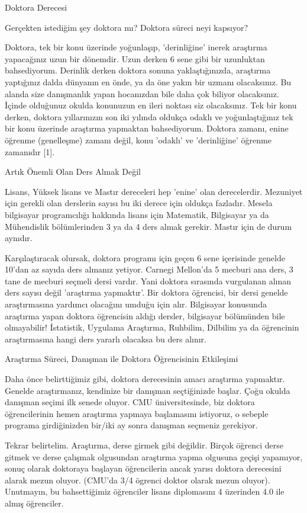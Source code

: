 \documentclass[12pt,fleqn]{article}\usepackage{../../common}
\begin{document}
Doktora Derecesi

Gerçekten istediğim şey doktora mı? Doktora süreci neyi kapsıyor?

Doktora, tek bir konu üzerinde yoğunlaşıp, 'derinliğine' inerek araştırma
yapacağınız uzun bir dönemdir. Uzun derken 6 sene gibi bir uzunluktan
bahsediyorum. Derinlik derken doktora sonuna yaklaştığınızda, araştırma
yaptığınız dalda dünyanın en önde, ya da öne yakın bir uzmanı
olacaksınız. Bu alanda size danışmanlık yapan hocanızdan bile daha çok
biliyor olacaksınız. İçinde olduğunuz okulda konunuzun en ileri noktası siz
olacaksınız. Tek bir konu derken, doktora yıllarınızın son iki yılında
oldukça odaklı ve yoğunlaştığınız tek bir konu üzerinde araştırma yapmaktan
bahsediyorum. Doktora zamanı, enine öğrenme (genelleşme) zamanı değil, konu
'odaklı' ve 'derinliğine' öğrenme zamanıdır [1].

Artık Önemli Olan Ders Almak Değil

Lisans, Yüksek lisans ve Mastır dereceleri hep 'enine' olan
derecelerdir. Mezuniyet için gerekli olan derslerin sayısı bu iki derece
için oldukça fazladır. Mesela bilgisayar programcılığı hakkında lisans için
Matematik, Bilgisayar ya da Mühendislik bölümlerinden 3 ya da 4 ders almak
gerekir. Mastır için de durum aynıdır.

Karşılaştıracak olursak, doktora programı için geçen 6 sene içerisinde
genelde 10'dan az sayıda ders almanız yetiyor. Carnegi Mellon'da 5 mecburi
ana ders, 3 tane de mecburi seçmeli dersi vardır. Yani doktora sırasında
vurgulanan alınan ders sayısı değil 'araştırma yapmaktır'. Bir doktora
öğrencisi, bir dersi genelde araştırmasına yardımcı olacağını umduğu için
alır. Bilgisayar konusunda araştırma yapan doktora öğrencisin aldığı
dersler, bilgisayar bölümünden bile olmayabilir! İstatistik, Uygulama
Araştırma, Ruhbilim, Dilbilim ya da öğrencinin araştırmasına hangi ders
yararlı olacaksa bu ders alınır.

Araştırma Süreci, Danışman ile Doktora Öğrencisinin Etkileşimi

Daha önce belirttiğimiz gibi, doktora derecesinin amacı araştırma
yapmaktır. Genelde araştırmanız, kendinize bir danışman seçtiğinizde
başlar. Çoğu okulda danışman seçimi ilk senede oluyor. CMU üniversitesinde,
biz doktora öğrencilerinin hemen araştırma yapmaya başlamasını istiyoruz, o
sebeple programa girdiğinizden bir/iki ay sonra danışman seçmeniz
gerekiyor.

Tekrar belirtelim. Araştırma, derse girmek gibi değildir. Birçok öğrenci
derse gitmek ve derse çalışmak olgusundan araştırma yapma olgusuna geçişi
yapamıyor, sonuç olarak doktoraya başlayan öğrencilerin ancak yarısı
doktora derecesini alarak mezun oluyor. (CMU'da 3/4 ögrenci doktor olarak
mezun oluyor). Unutmayın, bu bahsettiğimiz öğrenciler lisans diplomasını 4
üzerinden 4.0 ile almış öğrenciler.
\end{document}
